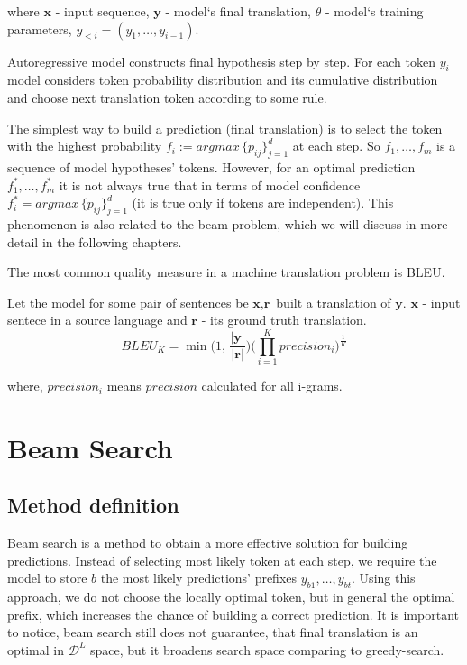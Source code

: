 \documentclass[a4paper,14pt]{extarticle}
\begin{document}
	where $\textbf{x}$ - input sequence, $\textbf{y}$ - model`s final translation, $\theta$ - model`s training parameters, $y_{<i} = (y_1, \dots, y_{i - 1})$.
	
	Autoregressive model constructs final hypothesis step by step. For each token $y_i$ model considers token probability distribution and its cumulative distribution and choose next translation token according to some rule.

	The simplest way to build a prediction (final translation) is to select the token with the highest probability $f_i := argmax \, \{p_{ij}\}_{j=1}^{d}$ at each step. So $f_1, \dots, f_m$ is a sequence of model hypotheses' tokens. However, for an optimal prediction $f_1^*, \dots, f_m^*$ it is not always true that in terms of model confidence $f_i^* = argmax \, \{p_{ij}\}_{j=1}^{d}$ (it is true only if tokens are independent). This phenomenon is also related to the beam problem, which we will discuss in more detail in the following chapters.
	
	The most common quality measure in a machine translation problem is BLEU.
	
	Let the model for some pair of sentences be $\textbf{x}, \textbf{r}$ built a translation of $\textbf{y}$. $\textbf{x}$ - input sentece in a source language and $\textbf{r}$ - its ground truth translation.
	\begin{equation}
		BLEU_K = \min\Big(1, \, \frac{|\textbf{y}|}{|\textbf{r}|}\Big) \big(\prod_{i=1}^{K} precision_i\big)^{\frac1K}
	\end{equation}

	where, $precision_i$ means $precision$ calculated for all i-grams.
	
	\section{Beam Search}
	\subsection{Method definition}
	
	Beam search is a method to obtain a more effective solution for building predictions. Instead of selecting most likely token at each step, we require the model to store $b$ the most likely predictions' prefixes $y_{b1}, \dots, y_{bt}$. Using this approach, we do not choose the locally optimal token, but in general the optimal prefix, which increases the chance of building a correct prediction. It is important to notice, beam search still does not guarantee, that final translation is an optimal in $\mathcal{D}^L$ space, but it broadens search space comparing to greedy-search.
	
\end{document}
